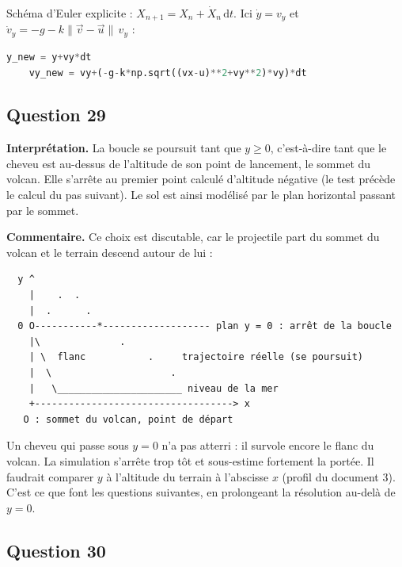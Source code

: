 \documentclass[11pt,a4paper]{article}
\renewcommand{\geq}{\geqslant}
\begin{document}
Schéma d'Euler explicite : \(X_{n+1} = X_n + \dot X_n\,\mathrm{d}t\). Ici \(\dot y = v_y\) et \(\dot v_y = -g - k\|\vec v - \vec u\|\,v_y\) :

\begin{lstlisting}[language=Python]
    y_new = y+vy*dt
    vy_new = vy+(-g-k*np.sqrt((vx-u)**2+vy**2)*vy)*dt
\end{lstlisting}

\hypertarget{question-29}{%
\subsection{Question 29}\label{question-29}}

\textbf{Interprétation.} La boucle se poursuit tant que \(y \geq 0\), c'est-à-dire tant que le cheveu est au-dessus de l'altitude de son point de lancement, le sommet du volcan. Elle s'arrête au premier point calculé d'altitude négative (le test précède le calcul du pas suivant). Le sol est ainsi modélisé par le plan horizontal passant par le sommet.

\textbf{Commentaire.} Ce choix est discutable, car le projectile part du sommet du volcan et le terrain descend autour de lui :

\begin{lstlisting}
  y ^
    |    .  .
    |  .      .
  0 O-----------*------------------- plan y = 0 : arrêt de la boucle
    |\              .
    | \  flanc           .     trajectoire réelle (se poursuit)
    |  \                     .
    |   \______________________ niveau de la mer
    +-----------------------------------> x
   O : sommet du volcan, point de départ
\end{lstlisting}

Un cheveu qui passe sous \(y = 0\) n'a pas atterri : il survole encore le flanc du volcan. La simulation s'arrête trop tôt et sous-estime fortement la portée. Il faudrait comparer \(y\) à l'altitude du terrain à l'abscisse \(x\) (profil du document 3). C'est ce que font les questions suivantes, en prolongeant la résolution au-delà de \(y = 0\).

\hypertarget{question-30}{%
\subsection{Question 30}\label{question-30}}
\end{document}
